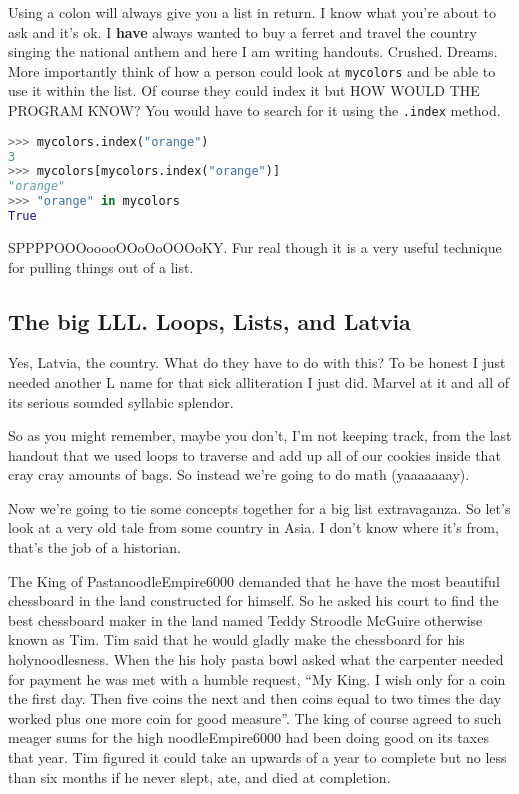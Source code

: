 \documentclass{article}
\begin{document}
Using a colon will always give you a list in return.
I know what you're about to ask and it's ok. 
I \textbf{have} always wanted to buy a ferret and travel the country singing the national 
anthem and here I am writing handouts. 
Crushed. 
Dreams. 
More importantly think of how a person could look at \verb|mycolors| and be able to use it 
within the list. 
Of course they could index it but HOW WOULD THE PROGRAM KNOW?
You would have to search for it using the \verb|.index| method.
\begin{lstlisting}[language=Python]
>>> mycolors.index("orange")
3
>>> mycolors[mycolors.index("orange")]
"orange"
>>> "orange" in mycolors
True
\end{lstlisting}

SPPPPOOOooooOOoOoOOOoKY.
Fur real though it is a very useful technique for pulling things out of a list.

\subsection{The big LLL. Loops, Lists, and Latvia}

Yes, Latvia, the country. 
What do they have to do with this? 
To be honest I just needed another L name for that sick alliteration I just did. 
Marvel at it and all of its serious sounded syllabic splendor.

So as you might remember, maybe you don't, I'm not keeping track, from the last handout that 
we used loops to traverse and add up all of our cookies inside that cray cray amounts of bags. 
So instead we're going to do math (yaaaaaaay). 

Now we're going to tie some concepts together for a big list extravaganza. 
So let's look at a very old tale from some country in Asia. 
I don't know where it's from, that's the job of a historian. 
\begin{displayquote}
The King of PastanoodleEmpire6000 demanded that he have the most beautiful chessboard in the 
land constructed for himself. 
So he asked his court to find the best chessboard maker in the land named Teddy Stroodle McGuire 
otherwise known as Tim. 
Tim said that he would gladly make the chessboard for his holynoodlesness. 
When the his holy pasta bowl asked what the carpenter needed for payment he was met with a 
humble request, ``My King. I wish only for a coin the first day. Then five coins the 
next and then coins equal to two times the day worked plus one more coin for good measure''.
The king of course agreed to such meager sums for the high noodleEmpire6000 had been doing 
good on its taxes that year.
Tim figured it could take an upwards of a year to complete but no less than six months if he 
never slept, ate, and died at completion.
\end{displayquote}
\end{document}

